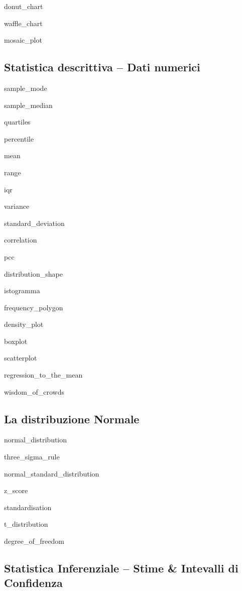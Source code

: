 \documentclass{report}
\begin{document}
\gls{donut_chart}

\gls{waffle_chart}

\gls{mosaic_plot}




\subsection*{Statistica descrittiva -- Dati numerici}

\gls{sample_mode}

\gls{sample_median}

\gls{quartiles}

\gls{percentile}

\gls{mean}

\gls{range}

\gls{iqr}

\gls{variance}

\gls{standard_deviation}

\gls{correlation}

\gls{pcc}

\gls{distribution_shape}

\gls{istogramma}

\gls{frequency_polygon}

\gls{density_plot}

\gls{boxplot}

\gls{scatterplot}

\gls{regression_to_the_mean}

\gls{wisdom_of_crowds}




\subsection*{La distribuzione Normale}

\gls{normal_distribution}

\gls{three_sigma_rule}

\gls{normal_standard_distribution}

\gls{z_score}

\gls{standardisation}

\gls{t_distribution}

\gls{degree_of_freedom}



\subsection*{Statistica Inferenziale -- Stime \& Intevalli di Confidenza}
\end{document}
